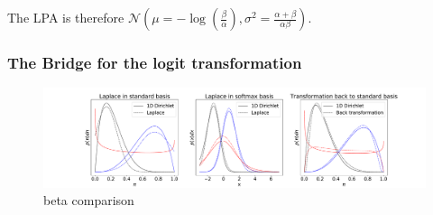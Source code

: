 The LPA is therefore $\mathcal{N}(\mu=-\log(\frac{\beta}{\alpha}), \sigma^2 = \frac{\alpha + \beta}{\alpha \beta})$.

\subsubsection{The Bridge for the logit transformation}


\begin{figure}[!htb]
	\centering
	\includegraphics[width=\textwidth]{figures/beta_playground.pdf}
	\caption{beta comparison}
	\label{fig:beta_comparison}
\end{figure}